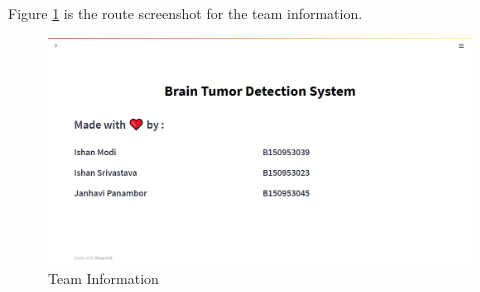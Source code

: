 Figure \ref{fig:page5} is the route screenshot for the team information.
\begin{figure}[H]
\includegraphics[scale=0.5, angle =90]{Photos/Page5.png}
\caption{Team Information} \label{fig:page5}
\end{figure}

